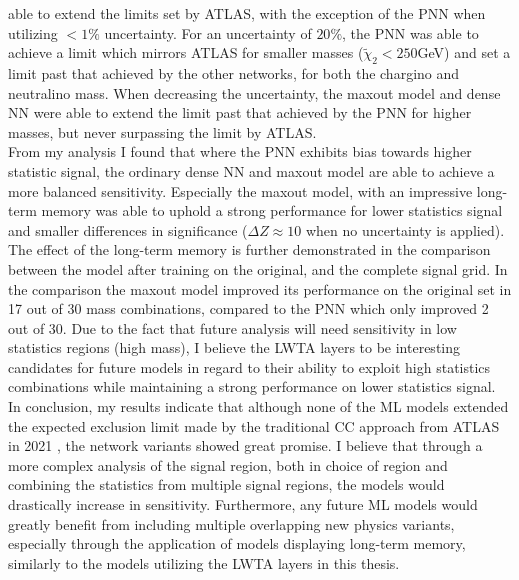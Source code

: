 able to extend the limits set by \ac{ATLAS}, with the exception of the \ac{PNN} when utilizing $<1\%$ uncertainty. For an uncertainty of $20\%$, the \ac{PNN} was able to achieve a limit which mirrors \ac{ATLAS} for smaller masses ($\tilde{\chi}_2<250$GeV)
and set a limit past that achieved by the other networks, for both the chargino and neutralino mass. When decreasing the uncertainty, the maxout model and dense \ac{NN} were able to extend the limit past that achieved by the \ac{PNN} for higher masses, 
but never surpassing the limit by \ac{ATLAS}.
\\\newline
From my analysis I found that where the \ac{PNN} exhibits bias towards higher statistic signal, the ordinary dense \ac{NN} and maxout model are able to achieve a more balanced sensitivity. Especially the 
maxout model, with an impressive long-term memory was able to uphold a strong performance for lower statistics signal and smaller differences in significance ($\Delta Z \approx 10$ when no uncertainty is applied). The effect of the long-term memory 
is further demonstrated in the comparison between the model after training on the original, and the complete signal grid. In the comparison the maxout model improved its performance on the original set in 17 out of 30 mass combinations, compared to the \ac{PNN} which only improved
2 out of 30. Due to the fact that future analysis will need sensitivity in low statistics regions (high mass), I believe the \ac{LWTA} layers to be interesting candidates for future models in regard to their ability to exploit high statistics combinations while maintaining a 
strong performance on lower statistics signal. 
\\\newline
In conclusion, my results indicate that although none of the \ac{ML} models extended the expected exclusion limit made by the traditional \ac{CC} approach from \ac{ATLAS} in 2021 \cite{atlas_search_2021}, the network variants showed great promise. I believe
that through a more complex analysis of the signal region, both in choice of region and combining the statistics from multiple signal regions, the models would drastically increase in sensitivity. Furthermore, any future \ac{ML} models would greatly benefit from
including multiple overlapping new physics variants, especially through the application of models displaying long-term memory, similarly to the models utilizing the \ac{LWTA} layers in this thesis.
